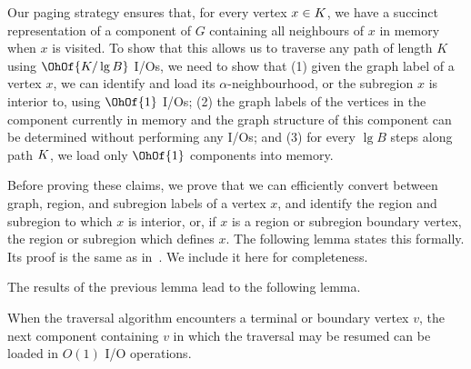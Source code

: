 Our paging strategy ensures that, for every vertex $x \in K$, we have
a succinct representation of a component of $G$ containing all
neighbours of $x$ in memory when $x$ is visited.
To show that this allows us to traverse any path of length $K$
using $\OhOf{K / \lg B}$ I/Os, we need to show that
(1) given the graph label of a vertex $x$, we can identify and load its
$\alpha$-neighbourhood, or the subregion $x$ is interior to, using $\OhOf{1}$
I/Os; (2) the graph labels of the vertices in the component currently
in memory and the graph structure of this component
can be determined without performing any I/Os; and (3) for every
$\lg B$ steps along path $K$, we load only $\OhOf{1}$ components into memory.

Before proving these claims, we prove that we can efficiently convert between
graph, region, and subregion labels of a vertex $x$, and identify the region and
subregion to which $x$ is interior, or, if $x$ is a region or subregion boundary vertex,
the region or subregion which defines $x$.
The following lemma states this formally.
Its proof is the same as in~\cite{DBLP:journals/talg/BoseCHMM12}.
We include it here for completeness.

The results of the previous lemma lead to the following lemma.

\begin{lemma}
\label{lem:component_ios}
When the traversal algorithm encounters a terminal or boundary
vertex $v$, the next component containing $v$ in which the traversal
may be resumed can be loaded in $O(1)$ I/O operations.
\end{lemma}

